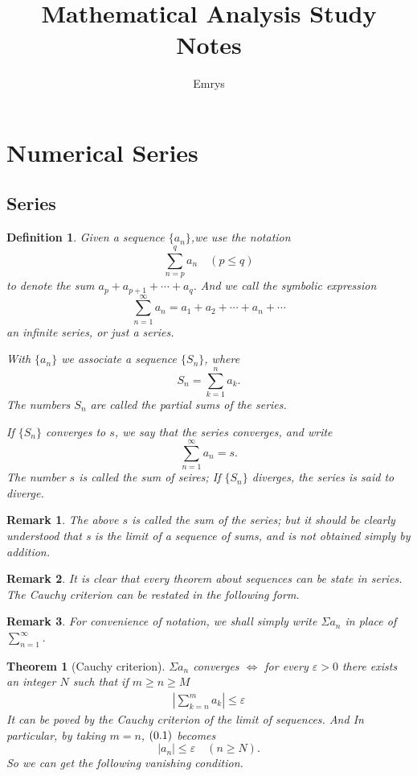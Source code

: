 \documentclass[12pt]{article}
\title{Mathematical Analysis Study Notes}
\author{Emrys}
\date{}
\theoremstyle{oneline}
\newtheorem{theorem}{Theorem}[subsection]
\newtheorem{remark}{Remark}[subsection]
\newtheorem{definition}{Definition}[subsection]
\theoremstyle{twoline}
\begin{document}
 
\maketitle
\tableofcontents
\newpage

\section{Numerical Series}

\subsection{Series}
\begin{definition}
  Given a sequence $\{a_n\}$,we use the notation
   \[\sum\limits_{n=p}^{q}a_n\quad (p\leq q)\]
  to denote the sum $a_p+a_{p+1}+\cdots+a_q$. And we call the symbolic expression
  \[\sum\limits_{n=1}^{\infty}a_n=a_1+a_2+\cdots+a_n+\cdots\]
  an infinite series, or just a series.

  With $\{a_n\}$ we associate a sequence $\{S_n\}$, where
  \[S_n=\sum\limits_{k=1}^n a_k.\]
  The numbers $S_n$ are called the partial sums of the series.

  If $\{S_n\}$ converges to $s$, we say that the series converges, and write
  \[\sum\limits_{n=1}^{\infty}a_n=s.\]
  The number $s$ is called the sum of seires; If $\{S_n\}$ diverges, the series is said to diverge.
\end{definition}

\begin{remark}
  The above $s$ is called the sum of the series; but it should be clearly understood that s is the limit of a sequence of sums, and is not obtained simply by addition.
\end{remark}

\begin{remark}
  It is clear that every theorem about sequences can be state in series. The Cauchy criterion can be restated in the following form. 
\end{remark}

\begin{remark}
  For convenience of notation, we shall simply write $\Sigma a_n$ in place of $\sum\limits_{n=1}^{\infty}$.
\end{remark}

\begin{theorem}[Cauchy criterion]
  $\Sigma a_n$ converges $\iff$ for every $\varepsilon>0$ there exists an integer $N$ such that if $m\geq n\geq M$
  \begin{align}
    |\sum\limits_{k=n}^m a_k|\leq \varepsilon
  \end{align}
  It can be poved by the Cauchy criterion of the limit of sequences.
  And In particular, by taking $m=n$, $(\thesection.1)$ becomes
  \[|a_n|\leq\varepsilon\quad(n\geq N).\]
  So we can get the following vanishing condition.
\end{theorem}
\end{document}
